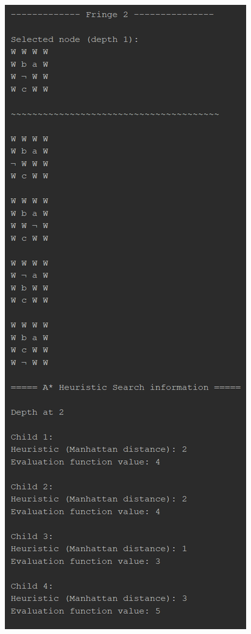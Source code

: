 \documentclass{article}
\begin{document}
	\begin{figure}[h]
		\centering
		\includegraphics[height=0.75\textheight]{AStar-1-2.png}
	\end{figure}
\end{document}
